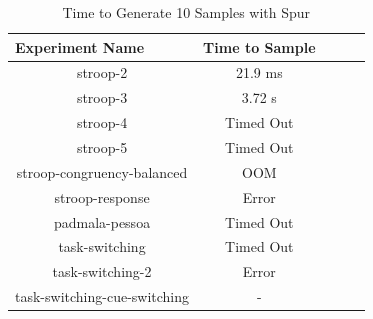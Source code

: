 




\begin{table}[htb]
  \centering
  \caption{Time to Generate 10 Samples with Spur}
\begin{tabular}{|c|c|c|c|c|}
\hline
\multicolumn{1}{|l|}{Experiment Name} & Time to Sample                \\ \hline
stroop-2                              & 21.9 ms                       \\ \hline
stroop-3                              & 3.72 s                        \\ \hline
stroop-4                              & Timed Out                     \\ \hline
stroop-5                              & Timed Out                     \\ \hline
stroop-congruency-balanced            & OOM                           \\ \hline  %
stroop-response                       & Error                         \\ \hline  %
padmala-pessoa                        & Timed Out                     \\ \hline  %
task-switching                        & Timed Out                     \\ \hline  %
task-switching-2                      & Error                         \\ \hline  %
task-switching-cue-switching          & -                             \\ \hline  %
\end{tabular}
\label{tab:benchmark_experiments_spur}%
\end{table}

